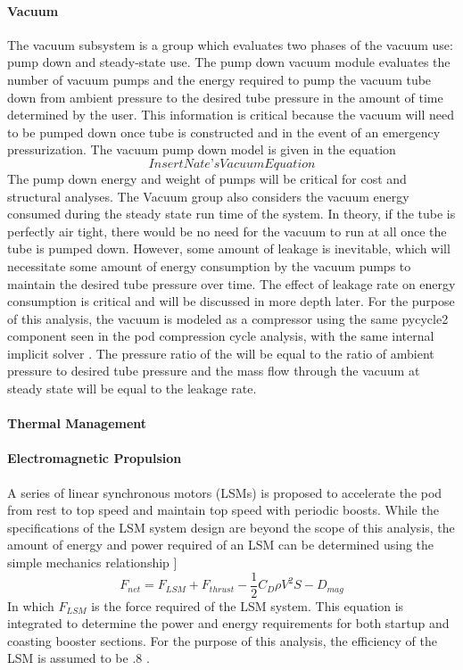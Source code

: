 \paragraph{Vacuum}
	The vacuum subsystem is a group which evaluates two phases of the vacuum use: pump down and steady-state use. The pump down vacuum module evaluates the number of vacuum pumps and the energy required to pump the vacuum tube down from ambient pressure to the desired tube pressure in the amount of time determined by the user. This information is critical because the vacuum will need to be pumped down once tube is constructed and in the event of an emergency pressurization. The vacuum pump down model is given in the equation 
	\begin{equation}
		\label{eq:vacuum}
		Insert Nate’s Vacuum Equation
	\end{equation}
	The pump down energy and weight of pumps will be critical for cost and structural analyses.
	The Vacuum group also considers the vacuum energy consumed during the steady state run time of the system. In theory, if the tube is perfectly air tight, there would be no need for the vacuum to run at all once the tube is pumped down. However, some amount of leakage is inevitable, which will necessitate some amount of energy consumption by the vacuum pumps to maintain the desired tube pressure over time. The effect of leakage rate on energy consumption is critical and will be discussed in more depth later. For the purpose of this analysis, the vacuum is modeled as a compressor using the same pycycle2 component seen in the pod compression cycle analysis, with the same internal implicit solver \cite{pycycle2}. The pressure ratio of the will be equal to the ratio of ambient pressure to desired tube pressure and the mass flow through the vacuum at steady state will be equal to the leakage rate.
\paragraph{Thermal Management}
	  \cite{Chin}
\paragraph{Electromagnetic Propulsion}
	A series of linear synchronous motors (LSMs) is proposed to accelerate the pod from rest to top speed and maintain top speed with periodic boosts. While the specifications of the LSM system design are beyond the scope of this analysis, the amount of energy and power required of an LSM can be determined using the simple mechanics relationship ]
	\begin{equation}
		\label{eq:sum_of_forces}
		F_{net} = F_{LSM} + F_{thrust} - \frac{1}{2}C_{D}\rho V^{2}S - D_{mag}
	\end{equation}
	In which $F_{LSM}$ is the force required of the LSM system. This equation is integrated to determine the power and energy requirements for both startup and coasting booster sections. For the purpose of this analysis, the efficiency of the LSM is assumed to be .8 \cite{LSM}.
